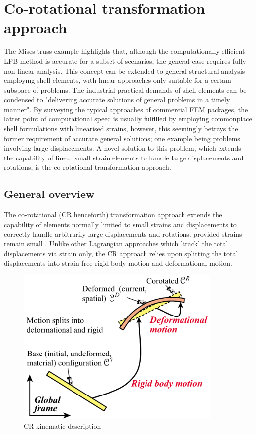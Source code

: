 \section{Co-rotational transformation approach}
The Mises truss example highlights that, although the computationally efficient LPB method is accurate for a subset of scenarios, the general case requires fully non-linear analysis. This concept can be extended to general structural analysis employing shell elements, with linear approaches only suitable for a certain subspace of problems. The industrial practical demands of shell elements can be condensed to "delivering accurate solutions of general problems in a timely manner". By surveying the typical approaches of commercial FEM packages, the latter point of computational speed is usually fulfilled by employing commonplace shell formulations with linearised strains, however, this seemingly betrays the former requirement of accurate general solutions; one example being problems involving large displacements. A novel solution to this problem, which extends the capability of linear small strain elements to handle large displacements and rotations, is the co-rotational transformation approach.

\subsection{General overview}
The co-rotational (CR henceforth) transformation approach extends the capability of elements normally limited to small strains and  displacements to correctly handle arbitrarily large displacements and rotations, provided strains remain small \cite{FelippaCR1_2016}. Unlike other Lagrangian approaches which 'track' the total displacements via strain only, the CR approach relies upon splitting the total displacements into strain-free rigid body motion and deformational motion.

\begin{figure}[H]
	\centering
	\def\svgwidth{\columnwidth}
	\includegraphics[width=10cm]{images/cr_1.png}
	\caption{CR kinematic description \cite{FelippaCR1_2016}}
	\label{cr1}
\end{figure}

